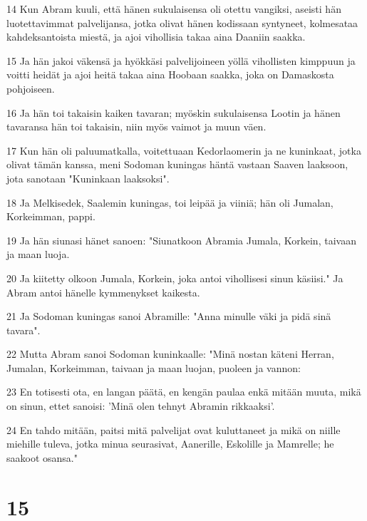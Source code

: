 \par 14 Kun Abram kuuli, että hänen sukulaisensa oli otettu vangiksi, aseisti hän luotettavimmat palvelijansa, jotka olivat hänen kodissaan syntyneet, kolmesataa kahdeksantoista miestä, ja ajoi vihollisia takaa aina Daaniin saakka.
\par 15 Ja hän jakoi väkensä ja hyökkäsi palvelijoineen yöllä vihollisten kimppuun ja voitti heidät ja ajoi heitä takaa aina Hoobaan saakka, joka on Damaskosta pohjoiseen.
\par 16 Ja hän toi takaisin kaiken tavaran; myöskin sukulaisensa Lootin ja hänen tavaransa hän toi takaisin, niin myös vaimot ja muun väen.
\par 17 Kun hän oli paluumatkalla, voitettuaan Kedorlaomerin ja ne kuninkaat, jotka olivat tämän kanssa, meni Sodoman kuningas häntä vastaan Saaven laaksoon, jota sanotaan "Kuninkaan laaksoksi".
\par 18 Ja Melkisedek, Saalemin kuningas, toi leipää ja viiniä; hän oli Jumalan, Korkeimman, pappi.
\par 19 Ja hän siunasi hänet sanoen: "Siunatkoon Abramia Jumala, Korkein, taivaan ja maan luoja.
\par 20 Ja kiitetty olkoon Jumala, Korkein, joka antoi vihollisesi sinun käsiisi." Ja Abram antoi hänelle kymmenykset kaikesta.
\par 21 Ja Sodoman kuningas sanoi Abramille: "Anna minulle väki ja pidä sinä tavara".
\par 22 Mutta Abram sanoi Sodoman kuninkaalle: "Minä nostan käteni Herran, Jumalan, Korkeimman, taivaan ja maan luojan, puoleen ja vannon:
\par 23 En totisesti ota, en langan päätä, en kengän paulaa enkä mitään muuta, mikä on sinun, ettet sanoisi: 'Minä olen tehnyt Abramin rikkaaksi'.
\par 24 En tahdo mitään, paitsi mitä palvelijat ovat kuluttaneet ja mikä on niille miehille tuleva, jotka minua seurasivat, Aanerille, Eskolille ja Mamrelle; he saakoot osansa."

\chapter{15}

